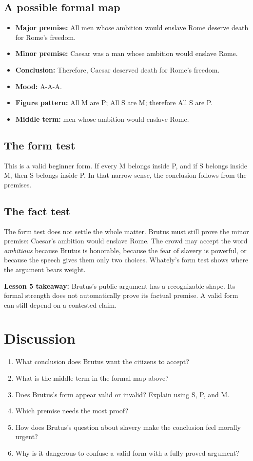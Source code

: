 \documentclass[12pt]{article}
\newcommand{\focusbox}[1]{\par\vspace{0.35em}\noindent\begingroup\setlength{\fboxsep}{6pt}\colorbox{gray!12}{\begin{minipage}{\dimexpr\linewidth-2\fboxsep\relax}#1\end{minipage}}\endgroup\par\vspace{0.45em}}
\begin{document}
\subsection*{A possible formal map}
\begin{itemize}[leftmargin=*]
\item \textbf{Major premise:} All men whose ambition would enslave Rome deserve death for Rome's freedom.
\item \textbf{Minor premise:} Caesar was a man whose ambition would enslave Rome.
\item \textbf{Conclusion:} Therefore, Caesar deserved death for Rome's freedom.
\item \textbf{Mood:} A-A-A.
\item \textbf{Figure pattern:} All M are P; All S are M; therefore All S are P.
\item \textbf{Middle term:} men whose ambition would enslave Rome.
\end{itemize}

\subsection*{The form test}
This is a valid beginner form. If every M belongs inside P, and if S belongs inside M, then S belongs inside P. In that narrow sense, the conclusion follows from the premises.

\subsection*{The fact test}
The form test does not settle the whole matter. Brutus must still prove the minor premise: Caesar's ambition would enslave Rome. The crowd may accept the word \textit{ambitious} because Brutus is honorable, because the fear of slavery is powerful, or because the speech gives them only two choices. Whately's form test shows where the argument bears weight.

\focusbox{\textbf{Lesson 5 takeaway:} Brutus's public argument has a recognizable shape. Its formal strength does not automatically prove its factual premise. A valid form can still depend on a contested claim.}

\section*{Discussion}
\begin{enumerate}[leftmargin=*]
\item What conclusion does Brutus want the citizens to accept?
\item What is the middle term in the formal map above?
\item Does Brutus's form appear valid or invalid? Explain using S, P, and M.
\item Which premise needs the most proof?
\item How does Brutus's question about slavery make the conclusion feel morally urgent?
\item Why is it dangerous to confuse a valid form with a fully proved argument?
\end{enumerate}
\end{document}
